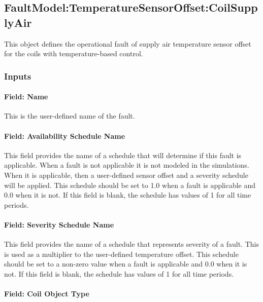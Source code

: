 \subsection{FaultModel:TemperatureSensorOffset:CoilSupplyAir}\label{faultmodeltemperaturesensoroffsetcoilsupplyair}

This object defines the operational fault of supply air temperature sensor offset for the coils with temperature-based control.

\subsubsection{Inputs}

\paragraph{Field: Name}

This is the user-defined name of the fault.

\paragraph{Field: Availability Schedule Name}

This field provides the name of a schedule that will determine if this fault is applicable. When a fault is not applicable it is not modeled in the simulations. When it is applicable, then a user-defined sensor offset and a severity schedule will be applied. This schedule should be set to 1.0 when a fault is applicable and 0.0 when it is not. If this field is blank, the schedule has values of 1 for all time periods.

\paragraph{Field: Severity Schedule Name}\label{field-severity-schedule-name}

This field provides the name of a schedule that represents severity of a fault. This is used as a multiplier to the user-defined temperature offset. This schedule should be set to a non-zero value when a fault is applicable and 0.0 when it is not. If this field is blank, the schedule has values of 1 for all time periods.

\paragraph{Field: Coil Object Type}\label{field-coil-object-type}

